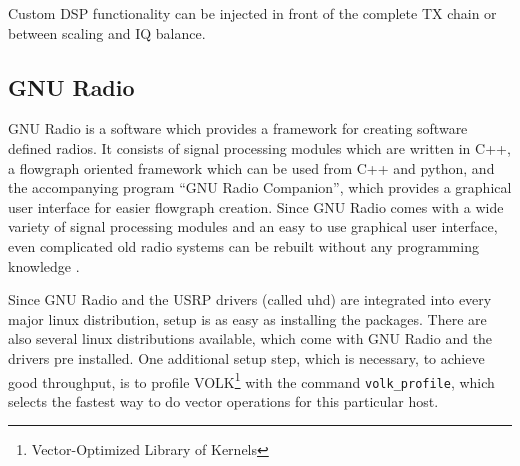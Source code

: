 \documentclass[12pt,a4paper,parskip=full]{scrartcl}
\begin{document}
Custom DSP functionality can be injected in front of the complete TX chain or between
scaling and IQ balance.

\subsection{GNU Radio}
\label{sec:intgnu}
GNU Radio is a software which provides a framework for creating software defined radios. It consists
of signal processing modules which are written in C++, a flowgraph oriented framework which can be
used from C++ and python, and the accompanying program ``GNU Radio Companion''\cite{gnuradio_grc},
which provides a graphical user interface for easier flowgraph creation. Since GNU Radio comes
with a wide variety of signal processing modules and an easy to use graphical user interface,
even complicated old radio systems can be rebuilt without any programming knowledge \cite{isee3}.

Since GNU Radio and the USRP drivers (called uhd) are integrated into every
major linux distribution, setup is as easy as installing the packages. There are
also several linux distributions available, which come with GNU Radio and the drivers
pre installed. One additional setup step, which is necessary, to achieve good throughput,
is to profile VOLK\footnote{Vector-Optimized Library of Kernels} with the command
\verb+volk_profile+, which selects the fastest way to do vector operations for this
particular host\cite{gnuradio_volk}.
\end{document}

